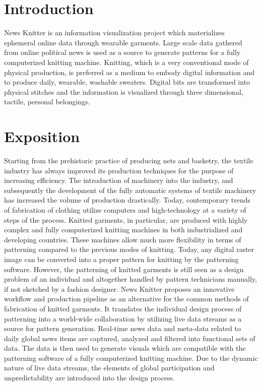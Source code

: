 \documentclass{acmsiggraph}                     %
\begin{document}

\section{Introduction}



News Knitter is an information visualization project which materializes ephemeral online data through wearable garments. Large scale data gathered from online political news is used as a source to generate patterns for a fully computerized knitting machine. Knitting, which is a very conventional mode of physical production, is preferred as a medium to embody digital information and to produce daily, wearable, washable sweaters. Digital bits are transformed into physical stitches and the information is visualized through three dimensional, tactile, personal belongings. 


\section{Exposition}

Starting from the prehistoric practice of producing nets and basketry, the textile industry has always improved its production techniques for the purpose of increasing efficiency. The introduction of machinery into the industry, and subsequently the development of the fully automatic systems of textile machinery has increased the volume of production drastically. Today, contemporary trends of fabrication of clothing utilize computers and high-technology at a variety of steps of the process. Knitted garments, in particular, are produced with highly complex and fully computerized knitting machines in both industrialized and developing countries. These machines allow much more flexibility in terms of patterning compared to the previous modes of knitting. Today, any digital raster image can be converted into a proper pattern for knitting by the patterning software. However, the patterning of knitted garments is still seen as a design problem of an individual and altogether handled by pattern technicians manually, if not sketched by a fashion designer. News Knitter proposes an innovative workflow and production pipeline as an alternative for the common methods of fabrication of knitted garments. It translates the individual design process of patterning into a world-wide collaboration by utilizing live data streams as a source for pattern generation. Real-time news data and meta-data related to daily global news items are captured, analyzed and filtered into functional sets of data. The data is then used to generate visuals which are compatible with the patterning software of a fully computerized knitting machine. Due to the dynamic nature of live data streams, the elements of global participation and unpredictability are introduced into the design process. 
\end{document}
